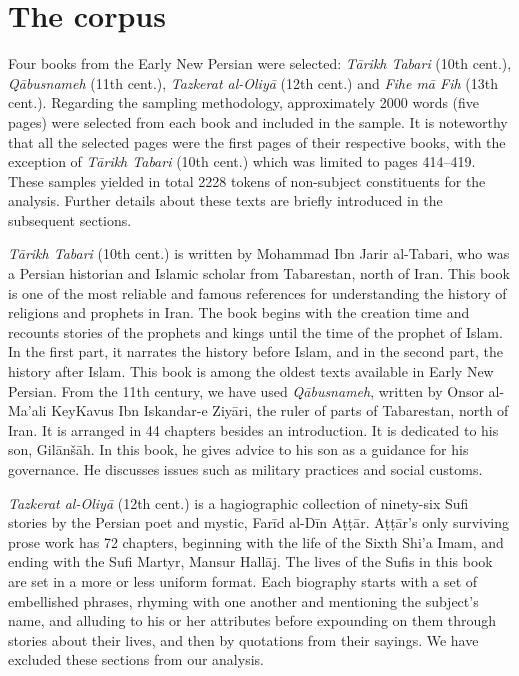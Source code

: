 \documentclass[output=paper,colorlinks,citecolor=brown,draftmode]{langscibook}
\begin{document}
\largerpage

\section{The corpus}\label{ENP:ss:2}

Four books from the Early New Persian were selected: \textit{Tārikh Tabari} (10th cent.), \textit{Qābusnameh} (11th cent.), \textit{Tazkerat al-Oliyā} (12th cent.) and \textit{Fihe mā Fih} (13th cent.). Regarding the sampling methodology, approximately 2000 words (five pages) were selected from each book and included in the sample. It is noteworthy that all the selected pages were the first pages of their respective books, with the exception of \textit{Tārikh Tabari} (10th cent.) which was limited to pages 414--419. These samples yielded in total 2228 tokens of non-subject constituents for the analysis. Further details about these texts are briefly introduced in the subsequent sections. 

\textit{Tārikh Tabari} (10th cent.) is written by Mohammad Ibn Jarir al-Tabari, who was a Persian historian and Islamic scholar from Tabarestan, north of Iran. This book is one of the most reliable and famous references for understanding the history of religions and prophets in Iran. The book begins with the creation time and recounts stories of the prophets and kings until the time of the prophet of Islam. In the first part, it narrates the history before Islam, and in the second part, the history after Islam. This book is among the oldest texts available in Early New Persian. From the 11th century, we have used \textit{Qābusnameh}, written by Onsor al-Ma'ali KeyKavus Ibn Iskandar-e Ziyāri, the ruler of parts of Tabarestan, north of Iran. It is arranged in 44 chapters besides an introduction. It is dedicated to his son, Gilānšāh. In this book, he gives advice to his son as a guidance for his governance. He discusses issues such as military practices and social customs. 

\textit{Tazkerat al-Oliyā} (12th cent.) is a hagiographic collection of ninety-six Sufi stories by the Persian poet and mystic, Farīd al-Dīn Aṭṭār. Aṭṭār's only surviving prose work has 72 chapters, beginning with the life of the Sixth Shi'a Imam, and ending with the Sufi Martyr, Mansur Hallāj. The lives of the Sufis in this book are set in a more or less uniform format. Each biography starts with a set of embellished phrases, rhyming with one another and mentioning the subject's name, and alluding to his or her attributes before expounding on them through stories about their lives, and then by quotations from their sayings. We have excluded these sections from our analysis. 
\end{document}

